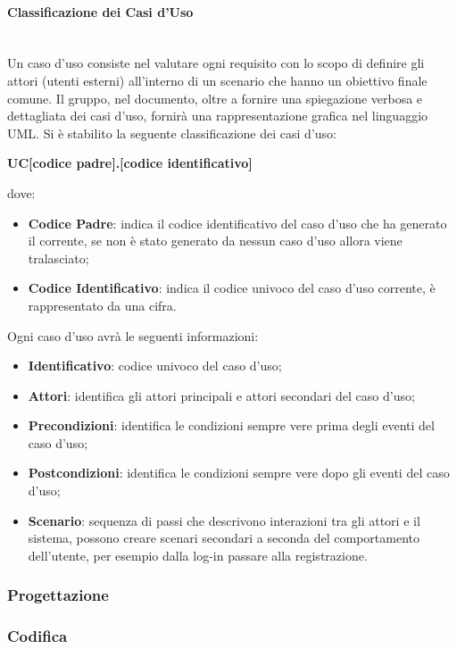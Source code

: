 \paragraph{Classificazione dei Casi d'Uso} \-\\
Un caso d'uso consiste nel valutare ogni requisito con lo scopo di definire gli attori (utenti esterni) all'interno di un scenario che hanno un obiettivo finale comune. Il gruppo, nel documento, oltre a fornire una spiegazione verbosa e dettagliata dei casi d'uso, fornirà una rappresentazione grafica nel linguaggio UML.
Si è stabilito la seguente classificazione dei casi d'uso:
\begin{center}
	\textbf{UC[codice padre].[codice identificativo]}
\end{center}
dove:
\begin{itemize}
	\item \textbf{Codice Padre}: indica il codice identificativo del caso d'uso che ha generato il corrente, se non è stato generato da nessun caso d'uso allora viene tralasciato;
	\item \textbf{Codice Identificativo}: indica il codice univoco del caso d'uso corrente, è rappresentato da una cifra.
\end{itemize}
Ogni caso d'uso avrà le seguenti informazioni:
\begin{itemize}
	\item \textbf{Identificativo}: codice univoco del caso d'uso;
	\item \textbf{Attori}: identifica gli attori principali e attori secondari del caso d'uso;
	\item \textbf{Precondizioni}: identifica le condizioni sempre vere prima degli eventi del caso d'uso;
	\item \textbf{Postcondizioni}: identifica le condizioni sempre vere dopo gli eventi del caso d'uso;
	\item \textbf{Scenario}: sequenza di passi che descrivono interazioni tra gli attori e il sistema, possono creare scenari secondari a seconda del comportamento dell'utente, per esempio dalla log-in passare alla registrazione.
\end{itemize}

\subsubsection{Progettazione}\label{Progettazione}


\subsubsection{Codifica}\label{Codifica}


